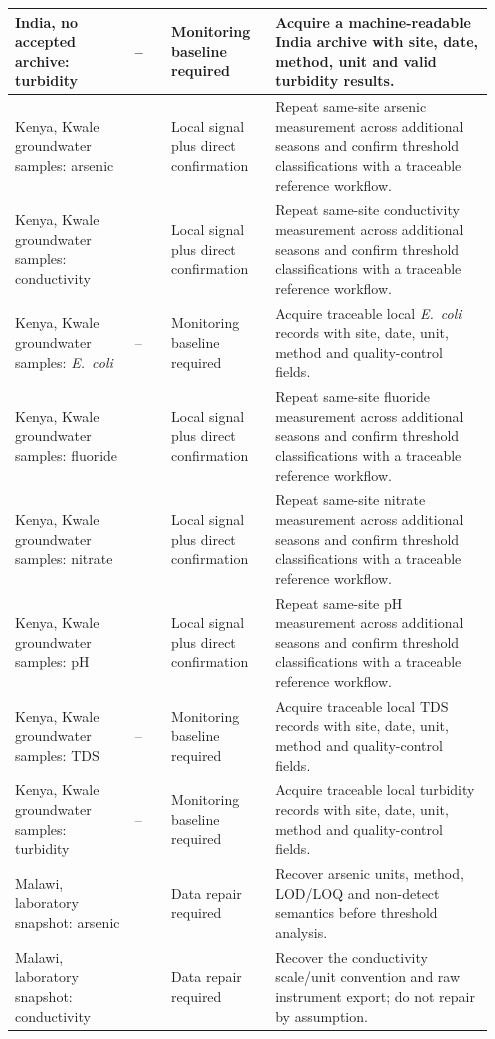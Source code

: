\documentclass[10pt,letterpaper]{article}
\begin{document}
{\begin{longtable}{>{\raggedright\arraybackslash}p{0.2385\linewidth}>{\raggedleft\arraybackslash}p{0.0769\linewidth}>{\raggedright\arraybackslash}p{0.2077\linewidth}>{\raggedright\arraybackslash}p{0.4262\linewidth}}
India, no accepted archive: turbidity & -- & Monitoring baseline required & Acquire a machine-readable India archive with site, date, method, unit and valid turbidity results. \\ \hline
Kenya, Kwale groundwater samples: arsenic & 140 & Local signal plus direct confirmation & Repeat same-site arsenic measurement across additional seasons and confirm threshold classifications with a traceable reference workflow. \\ \hline
Kenya, Kwale groundwater samples: conductivity & 140 & Local signal plus direct confirmation & Repeat same-site conductivity measurement across additional seasons and confirm threshold classifications with a traceable reference workflow. \\ \hline
Kenya, Kwale groundwater samples: \textit{E.~coli} & -- & Monitoring baseline required & Acquire traceable local \textit{E.~coli} records with site, date, unit, method and quality-control fields. \\ \hline
Kenya, Kwale groundwater samples: fluoride & 139 & Local signal plus direct confirmation & Repeat same-site fluoride measurement across additional seasons and confirm threshold classifications with a traceable reference workflow. \\ \hline
Kenya, Kwale groundwater samples: nitrate & 139 & Local signal plus direct confirmation & Repeat same-site nitrate measurement across additional seasons and confirm threshold classifications with a traceable reference workflow. \\ \hline
Kenya, Kwale groundwater samples: pH & 140 & Local signal plus direct confirmation & Repeat same-site pH measurement across additional seasons and confirm threshold classifications with a traceable reference workflow. \\ \hline
Kenya, Kwale groundwater samples: TDS & -- & Monitoring baseline required & Acquire traceable local TDS records with site, date, unit, method and quality-control fields. \\ \hline
Kenya, Kwale groundwater samples: turbidity & -- & Monitoring baseline required & Acquire traceable local turbidity records with site, date, unit, method and quality-control fields. \\ \hline
Malawi, laboratory snapshot: arsenic & 10 & Data repair required & Recover arsenic units, method, LOD/LOQ and non-detect semantics before threshold analysis. \\ \hline
Malawi, laboratory snapshot: conductivity & 31 & Data repair required & Recover the conductivity scale/unit convention and raw instrument export; do not repair by assumption. \\ \hline

\end{longtable}}
\end{document}
